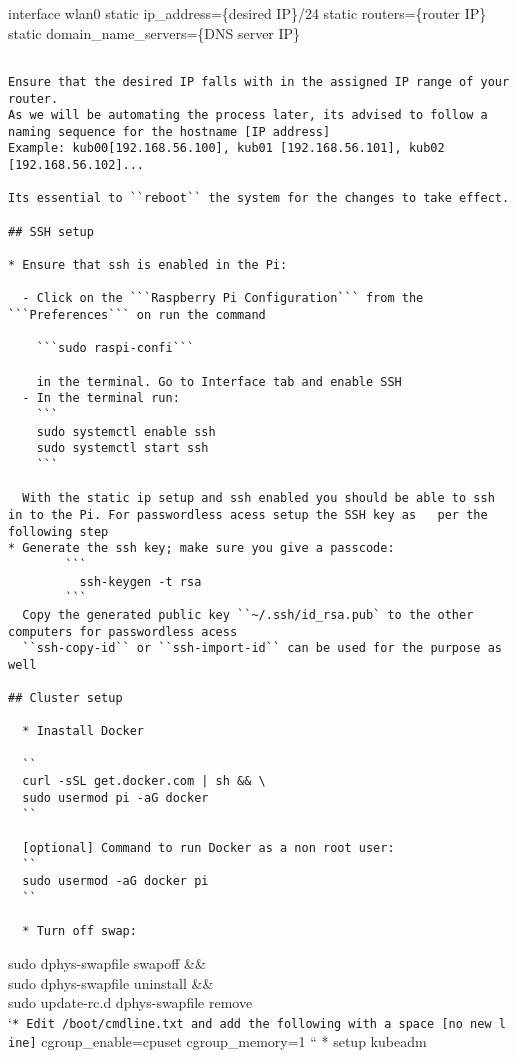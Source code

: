interface wlan0 static ip\_address=\{desired IP\}/24 static
routers=\{router IP\} static domain\_name\_servers=\{DNS server IP\}

\begin{lstlisting}

Ensure that the desired IP falls with in the assigned IP range of your router.
As we will be automating the process later, its advised to follow a naming sequence for the hostname [IP address]
Example: kub00[192.168.56.100], kub01 [192.168.56.101], kub02 [192.168.56.102]...

Its essential to ``reboot`` the system for the changes to take effect.

## SSH setup

* Ensure that ssh is enabled in the Pi:

  - Click on the ```Raspberry Pi Configuration``` from the ```Preferences``` on run the command 
      
    ```sudo raspi-confi``` 
        
    in the terminal. Go to Interface tab and enable SSH
  - In the terminal run:
    ```
    sudo systemctl enable ssh
    sudo systemctl start ssh
    ```

  With the static ip setup and ssh enabled you should be able to ssh in to the Pi. For passwordless acess setup the SSH key as   per the following step
* Generate the ssh key; make sure you give a passcode:
        ```
          ssh-keygen -t rsa 
        ```
  Copy the generated public key ``~/.ssh/id_rsa.pub` to the other computers for passwordless acess
  ``ssh-copy-id`` or ``ssh-import-id`` can be used for the purpose as well
  
## Cluster setup

  * Inastall Docker
  
  ``
  curl -sSL get.docker.com | sh && \
  sudo usermod pi -aG docker
  ``
  
  [optional] Command to run Docker as a non root user:
  ``
  sudo usermod -aG docker pi
  ``
  
  * Turn off swap:
\end{lstlisting}

sudo dphys-swapfile swapoff \&\&\\
sudo dphys-swapfile uninstall \&\&\\
sudo update-rc.d dphys-swapfile remove
`\texttt{*\ Edit\ /boot/cmdline.txt\ and\ add\ the\ following\ with\ a\ space\ {[}no\ new\ line{]}}
cgroup\_enable=cpuset cgroup\_memory=1 `` * setup kubeadm

